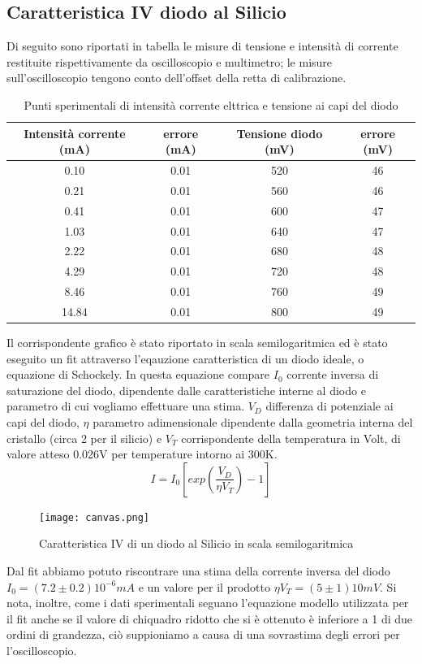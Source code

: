 \documentclass{article}
\begin{document}
\subsection{Caratteristica IV diodo al Silicio}
Di seguito sono riportati in tabella le misure di tensione e intensità di corrente restituite rispettivamente da oscilloscopio e multimetro; le misure sull’oscilloscopio tengono conto dell’offset della retta di calibrazione.
\begin{table}[h!]
    \centering
    \begin{tabular}{|||c|c||c|c||}
    \hline
    Intensità corrente (mA) & errore (mA) & Tensione diodo (mV) & errore (mV) \\
    \hline\hline
    0.10 & 0.01 & 520 & 46 \\
    0.21 & 0.01 & 560 & 46 \\
    0.41 & 0.01 & 600 & 47 \\
    1.03 & 0.01 & 640 & 47 \\
    2.22 & 0.01 & 680 & 48 \\
    4.29 & 0.01 & 720 & 48 \\
    8.46 & 0.01 & 760 & 49 \\
    14.84 & 0.01 & 800 & 49 \\
    \hline
    \end{tabular}
    \caption{Punti sperimentali di intensità corrente elttrica e tensione ai capi del diodo}
    \label{tab:my_label}
\end{table}
Il corrispondente grafico è stato riportato in scala semilogaritmica ed è stato eseguito un fit attraverso l’eqauzione caratteristica di un diodo ideale, o equazione di Schockely. In questa equazione compare \(I_0\) corrente inversa di saturazione del diodo, dipendente dalle caratteristiche interne al diodo e parametro di cui vogliamo effettuare una stima. \(V_D\) differenza di potenziale ai capi del diodo, \(\eta\) parametro adimensionale dipendente dalla geometria interna del cristallo (circa 2 per il silicio) e \(V_T\) corrispondente della temperatura in Volt, di valore atteso 0.026V per temperature intorno ai 300K.
\begin{equation}
I = I_0 [exp({\frac{V_D}{\eta V_T}})-1]
\end{equation}
\begin{figure}
    \centering
    \texttt{[image: canvas.png]}
    \caption{Caratteristica IV di un diodo al Silicio in scala semilogaritmica}
    \label{fig:my_label}
\end{figure}
Dal fit abbiamo potuto riscontrare una stima della corrente inversa del diodo \(I_0 = (7.2\pm0.2)10^{-6}mA\) e un valore per il prodotto \(\eta V_T=(5\pm1)10mV\). Si nota, inoltre, come i dati sperimentali seguano l’equazione modello utilizzata per il fit anche se il valore di chiquadro ridotto che si è ottenuto è inferiore a 1 di due ordini di grandezza, ciò suppioniamo a causa di una sovrastima degli errori per l’oscilloscopio.
\end{document}

